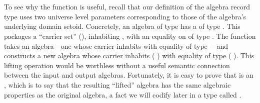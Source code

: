 \begin{code}%
\>[0]\<%
\\
\>[0]\AgdaSpace{}%
\AgdaSymbol{:}\AgdaSpace{}%
\AgdaSymbol{(}\AgdaSpace{}%
\AgdaSymbol{:}\AgdaSpace{}%
\AgdaSpace{}%
\AgdaSpace{}%
\AgdaSymbol{)(}\AgdaSpace{}%
\AgdaSpace{}%
\AgdaSymbol{:}\AgdaSpace{}%
\AgdaSymbol{)}\AgdaSpace{}%
\AgdaSpace{}%
\AgdaSpace{}%
\AgdaSymbol{(}\AgdaSpace{}%
\AgdaSpace{}%
\AgdaSymbol{)}\AgdaSpace{}%
\AgdaSymbol{(}\AgdaSpace{}%
\AgdaSpace{}%
\AgdaSymbol{)}\<%
\end{code}
\ifshort
\vskip2mm
\else
\begin{code}%
\>[0]\AgdaSpace{}%
\AgdaSpace{}%
\AgdaSpace{}%
\AgdaSpace{}%
\AgdaSymbol{=}\AgdaSpace{}%
\AgdaSpace{}%
\AgdaSymbol{(}\AgdaSpace{}%
\AgdaSpace{}%
\AgdaSymbol{)}\AgdaSpace{}%
\<%
\\
\>[0]\<%
\end{code}
\fi
\noindent To see why the  function is useful, recall that our definition of the algebra
record type uses two universe level parameters corresponding to those of the algebra's
underlying domain setoid.
\ifshort\else
Concretely, an algebra of type    has a
 of type   . This packages a ``carrier set''
(), inhabiting  , with an equality on  of type
  .
\fi
The  function takes an algebra---one whose carrier inhabits 
with equality of type   ---and constructs a new algebra whose
carrier inhabits  (  ) with equality of type 
 (  ). This lifting operation would be worthless without
a useful semantic connection between the input and output algebras.
Fortunately, it is easy to prove that  is an ,
which is to say that the resulting ``lifted'' algebra has the same algebraic properties as
the original algebra, a fact we will codify later in a type called .

